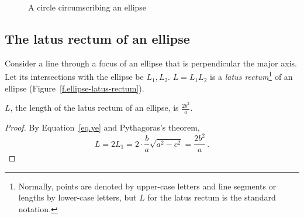 \begin{figure}[tb]
\begin{center}
\caption{A circle circumscribing an ellipse}\label{f.ellipse-circle}
\end{center}
\end{figure}


\subsection{The latus rectum of an ellipse}

\begin{definition}\label{def.ellipse-lr}
Consider a line through a focus of an ellipse that is perpendicular the major axis. Let its intersections with the ellipse be $L_1,L_2$. $L=L_1L_2$ is a \emph{latus rectum}\footnote{Normally, points are denoted by upper-case letters and line segments or lengths by lower-case letters, but $L$ for the latus rectum is the standard notation.} of an ellipse (Figure~\ref{f.ellipse-latus-rectum}).
\end{definition}
\begin{theorem}\label{thm.ellipse-lr}
$L$, the length of the latus rectum of an ellipse, is 
$\displaystyle\frac{2b^2}{a}$.
\end{theorem}
\begin{proof}
By Equation~\ref{eq.ye} and Pythagoras's theorem,
\[
L=2L_1=2\cdot\frac{b}{a}\sqrt{a^2-c^2}=\displaystyle\frac{2b^2}{a}\,.
\]\hqed
\end{proof}

